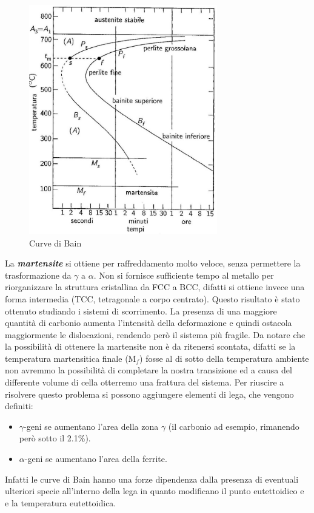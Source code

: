 \begin{figure}
    \centering
    \includegraphics[height=10cm]{acciaio e transizioni di fase/Curve_bain.png}
    \caption{Curve di Bain}
    \label{Bain-Curves}
\end{figure}

La \textbf{\textit{martensite}} si ottiene per raffreddamento molto veloce, senza permettere la trasformazione da $\gamma$ a $\alpha$. Non si fornisce sufficiente tempo al metallo per riorganizzare la struttura cristallina da FCC a BCC, difatti si ottiene invece una forma intermedia (TCC, tetragonale a corpo centrato).
Questo risultato è stato ottenuto studiando i sistemi di scorrimento. 
La presenza di una maggiore quantità di carbonio aumenta l'intensità della deformazione e quindi ostacola maggiormente le dislocazioni, rendendo però il sistema più fragile.
Da notare che la possibilità di ottenere la martensite non è da ritenersi scontata, difatti se la temperatura martensitica finale (M$_f$) fosse al di sotto della temperatura ambiente non avremmo la possibilità di completare la nostra transizione ed a causa del differente volume di cella otterremo una frattura del sistema.
Per riuscire a risolvere questo problema si possono aggiungere elementi di lega, che vengono definiti:
\begin{itemize}
    \item $\gamma$-geni se aumentano l'area della zona $\gamma$ (il carbonio ad esempio, rimanendo però sotto il 2.1\%).
    \item $\alpha$-geni se aumentano l'area della ferrite.
\end{itemize}
Infatti le curve di Bain hanno una forze dipendenza dalla presenza di eventuali ulteriori specie all'interno della lega in quanto modificano il punto eutettoidico e e la temperatura eutettoidica.

